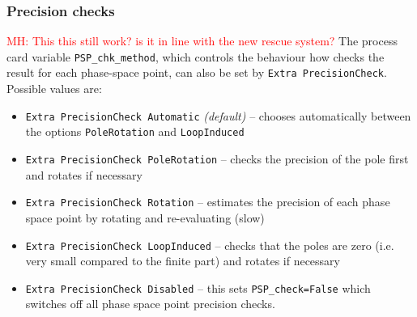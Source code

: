 \subsubsection{Precision checks}
\textcolor{red}{MH: This this still work? is it in line with the new rescue system?}
The \gosam{} process card variable \texttt{PSP\_chk\_method}, which controls the behaviour how \gosam{} checks the result for each phase-space point, can also be set by \lstinline[style=sh]|Extra PrecisionCheck|. Possible values are:
\begin{itemize}
	\item \texttt{Extra PrecisionCheck Automatic} \textit{(default)} -- chooses automatically between the options \texttt{PoleRotation} and \texttt{LoopInduced}
	\item \texttt{Extra PrecisionCheck PoleRotation} -- checks the precision of the pole first and rotates if necessary
	\item \texttt{Extra PrecisionCheck Rotation} -- estimates the precision of each phase space point by rotating and re-evaluating (slow)
	\item \texttt{Extra PrecisionCheck LoopInduced} -- checks that the poles are zero (i.e. very small compared to the finite part) and rotates if necessary
	\item \texttt{Extra PrecisionCheck Disabled}  -- this sets \texttt{PSP\_check=False} which switches off all phase space point precision checks.
\end{itemize}
